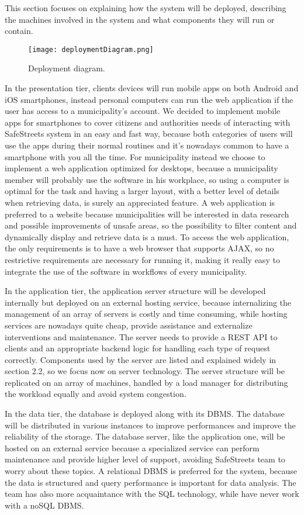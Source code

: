 This section focuses on explaining how the system will be deployed, describing the machines involved in the system and what components they will run or contain.

\begin{figure}[H]
	\centering
	\texttt{[image: deploymentDiagram.png]}
	\caption{Deployment diagram.}
\end{figure}

In the presentation tier, clients devices will run mobile apps on both Android and iOS smartphones, instead personal computers can run the web application if the user has access to a municipality's account. We decided to implement mobile apps for smartphones to cover citizens and authorities needs of interacting with SafeStreets system in an easy and fast way, because both categories of users will use the apps during their normal routines and it's nowadays common to have a smartphone with you all the time. For municipality instead we choose to implement a web application optimized for desktops, because a municipality member will probably use the software in his workplace, so using a computer is optimal for the task and having a larger layout, with a better level of details when retrieving data, is surely an appreciated feature. A web application is preferred to a website because municipalities will be interested in data research and possible improvements of unsafe areas, so the possibility to filter content and dynamically display and retrieve data is a must. To access the web application, the only requirements is to have a web browser that supports AJAX, so no restrictive requirements are necessary for running it, making it really easy to integrate the use of the software in workflows of every municipality.

In the application tier, the application server structure will be developed internally but deployed on an external hosting service, because internalizing the management of an array of servers is costly and time consuming, while hosting services are nowadays quite cheap, provide assistance and externalize interventions and maintenance. The server needs to provide a REST API to clients and an appropriate backend logic for handling each type of request correctly. Components used by the server are listed and explained widely in section 2.2, so we focus now on server technology. The server structure will be replicated on an array of machines, handled by a load manager for distributing the workload equally and avoid system congestion.

In the data tier, the database is deployed along with its DBMS. The database will be distributed in various instances to improve performances and improve the reliability of the storage. The database server, like the application one, will be hosted on an external service because a specialized service can perform maintenance and provide higher level of support, avoiding SafeStreets team to worry about these topics. A relational DBMS is preferred for the system, because the data is structured and query performance is important for data analysis. The team has also more acquaintance with the SQL technology, while have never work with a noSQL DBMS.
